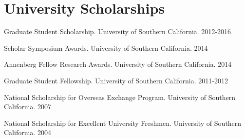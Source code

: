 \documentclass[letterpaper,11pt]{article}
\begin{document}
\section{University Scholarships}
  \begin{itemize}[leftmargin=0.15in, label={}]
    \small 
    {\item{
    Graduate Student Scholarship. University of Southern California. 2012-2016
    }}
    {\item{
    Scholar Symposium Awards. University of Southern California. 2014
    }}
    {\item{
    Annenberg Fellow Research Awards. University of Southern California. 2014
    }}
    {\item{
    Graduate Student Fellowship. University of Southern California. 2011-2012
    }}
    {\item{
    National Scholarship for Overseas Exchange Program. University of Southern California. 2007
    }}
    {\item{
    National Scholarship for Excellent University Freshmen. University of Southern California. 2004 
    }}
    {\item{}}

 \end{itemize}    

\end{document}
